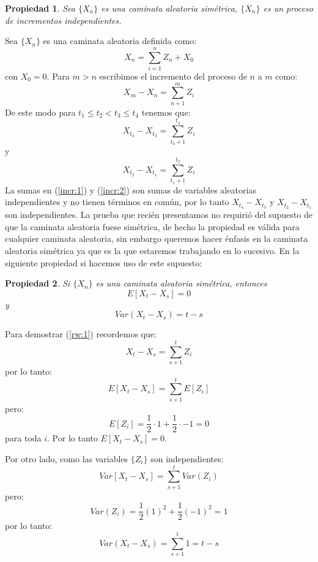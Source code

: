 \documentclass{extreport}
\makeatletter
\theoremstyle{definicion}
\theoremstyle{propiedad}
\newtheorem{propiedad}{Propiedad}[chapter]
\theoremstyle{teorema}
\renewenvironment{proof}[1][\proofname]{\par
    \pushQED{\qed}%
    \normalfont \topsep6\p@\@plus6\p@\relax
    \trivlist
    \item\relax
            {\itshape
        #1\@addpunct{.}}\hspace\labelsep\ignorespaces
}{%
    \popQED\endtrivlist\@endpefalse
}
\makeatother
\begin{document}
\begin{propiedad}
    Sea $\{X_n\}$ es una caminata aleatoria simétrica, $\{X_n\}$ es un proceso de incrementos independientes.
\end{propiedad}
\begin{proof}
    Sea $\{X_n\}$ es una caminata aleatoria definida como:
    $$
    X_n = \sum_{i=1}^n Z_n+X_0 
    $$
    con $X_0= 0$. Para $m>n$ escribimos el incremento del proceso de $n$ a $m$ como:
    $$
    X_m - X_n = \sum_{n+1}^m Z_i
    $$
De este modo para $t_1\leq t_2<t_3\leq t_4$ tenemos que:
\begin{equation}
    X_{t_4} - X_{t_3} = \sum_{t_3+1}^{t_4} Z_i
    \label{incr:1}
\end{equation}
y
\begin{equation}
    X_{t_2} - X_{t_1} = \sum_{t_1+1}^{t_2} Z_i    
    \label{incr:2}
\end{equation}
La sumas en (\ref{incr:1}) y (\ref{incr:2}) son sumas de variables aleatorias independientes y  no tienen términos en común, por lo tanto $X_{t_4} - X_{t_3}$ y $X_{t_2}-X_{t_1}$ son independientes.
\end{proof}
La prueba que recién presentamos no requirió del supuesto de que la caminata aleatoria fuese simétrica, de hecho la propiedad es válida para cualquier caminata aleatoria, sin embargo queremos hacer  énfasis en la caminata aleatoria simétrica ya que es la que estaremos trabajando en lo sucesivo. En la siguiente propiedad si hacemos uso de este supuesto:
\begin{propiedad}
    Si $\{X_n\}$ es una caminata aleatoria simétrica, entonces 
    \begin{equation}
        E[X_t-X_s] = 0
        \label{rw:1}
    \end{equation}
y
    \begin{equation}
        Var\left(X_t-X_s\right) = t-s
        \label{rw:2}
    \end{equation}
\end{propiedad}
\begin{proof}
    Para demostrar (\ref{rw:1}) recordemos que:
    $$
    X_t-X_s = \sum_{s+1}^t Z_i
    $$
    por lo tanto:
    $$
    E\left[X_t-X_s\right] = \sum_{s+1}^t E[Z_i]
    $$
    pero:
    $$
    E[Z_i] = \frac{1}{2}\cdot 1 + \frac{1}{2}\cdot -1 = 0
    $$
    para toda $i$. Por lo tanto $E[X_t-X_s] = 0$.

    Por otro lado, como las variables $\{Z_i\}$ son independientes:
    $$
    Var\left[X_t-X_s \right] = \sum_{s+1}^t Var(Z_i)
    $$
    pero:
    $$
    Var(Z_i) = \frac{1}{2}(1)^2 + \frac{1}{2}(-1)^2 = 1
    $$
    por lo tanto:
    $$
    Var\left(X_t-X_s\right) = \sum_{s+1}^t 1 = t-s
    $$
\end{proof}
\end{document}

